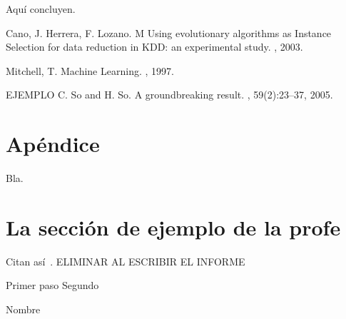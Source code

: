 \documentclass{ci5652}
\begin{document}
Aquí concluyen.


\small


\begin{thebibliography}{99}

Cano, J. Herrera, F. Lozano. M
\newblock Using evolutionary algorithms as Instance Selection for data
reduction in KDD: an experimental study.
, 2003.

Mitchell, T.
\newblock Machine Learning.
, 1997.

EJEMPLO C. So and H. So.
\newblock A groundbreaking result.
, 59(2):23--37, 2005.

\end{thebibliography}


\newpage
\section*{Apéndice}

Bla.


\section{La sección de ejemplo de la profe}
Citan así~\cite{so2005}. ELIMINAR AL ESCRIBIR EL INFORME

\begin{algorithm}
 \DontPrintSemicolon
 \vspace*{0.1cm}
 Primer paso\;
 Segundo\;
 \vspace*{0.1cm}
 \caption{Nombre}
\end{algorithm}
\end{document}
